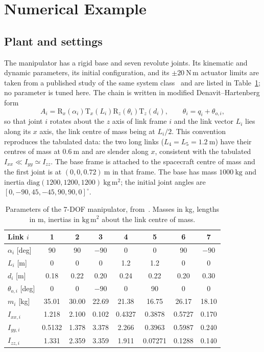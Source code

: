 \section{Numerical Example}\label{sec:simulation}

\subsection{Plant and settings}
The manipulator has a rigid base and seven revolute joints. Its kinematic and
dynamic parameters, its initial configuration, and its $\pm20~\mathrm{N\,m}$
actuator limits are taken from a published study of the same system
class~\cite{dou2025fractional} and are listed in Table~\ref{tab:params}; no
parameter is tuned here. The chain is written in modified
Denavit--Hartenberg form
\begin{equation}
 A_i=\mathrm{R}_x(\alpha_i)\mathrm{T}_x(L_i)\mathrm{R}_z(\theta_i)\mathrm{T}_z(d_i),
 \qquad \theta_i=q_i+\theta_{o,i},
 \label{eq:mdh}
\end{equation}
so that joint $i$ rotates about the $z$ axis of link frame $i$ and the link
vector $L_i$ lies along its $x$ axis, the link centre of mass being at
$L_i/2$. This convention reproduces the tabulated data: the two long links
($L_4=L_5=1.2~\mathrm{m}$) have their centres of mass at $0.6~\mathrm{m}$ and
are slender along $x$, consistent with the tabulated
$I_{xx}\ll I_{yy}\simeq I_{zz}$. The base frame is attached to the spacecraft
centre of mass and the first joint is at $(0,0,0.72)~\mathrm{m}$ in that frame.
The base has mass $1000~\mathrm{kg}$ and inertia
$\mathrm{diag}(1200,1200,1200)~\mathrm{kg\,m^2}$; the initial joint angles are
$[0,-90,45,-45,90,90,0]^\circ$.

\begin{table}[!t]
\centering
\caption{Parameters of the 7-DOF manipulator, from~\cite{dou2025fractional}. Masses in kg, lengths in m, inertias in $\mathrm{kg\,m^2}$ about the link centre of mass.}
\label{tab:params}
\footnotesize
\setlength{\tabcolsep}{3pt}
\begin{tabular}{lccccccc}
\toprule
Link $i$ & 1 & 2 & 3 & 4 & 5 & 6 & 7\\
\midrule
$\alpha_i$ [deg] & 90 & 90 & $-90$ & 0 & 0 & 90 & $-90$\\
$L_i$ [m]        & 0 & 0 & 0 & 1.2 & 1.2 & 0 & 0\\
$d_i$ [m]        & 0.18 & 0.22 & 0.20 & 0.24 & 0.22 & 0.20 & 0.30\\
$\theta_{o,i}$ [deg] & 0 & 0 & $-90$ & 0 & 90 & 0 & 0\\
$m_i$ [kg]       & 35.01 & 30.00 & 22.69 & 21.38 & 16.75 & 26.17 & 18.10\\
$I_{xx,i}$   & 1.218 & 2.100 & 0.102 & 0.4327 & 0.3878 & 0.5727 & 0.170\\
$I_{yy,i}$   & 0.5132 & 1.378 & 3.378 & 2.266 & 0.3963 & 0.5987 & 0.240\\
$I_{zz,i}$   & 1.331 & 2.359 & 3.359 & 1.911 & 0.07271 & 0.1288 & 0.140\\
\bottomrule
\end{tabular}
\end{table}

